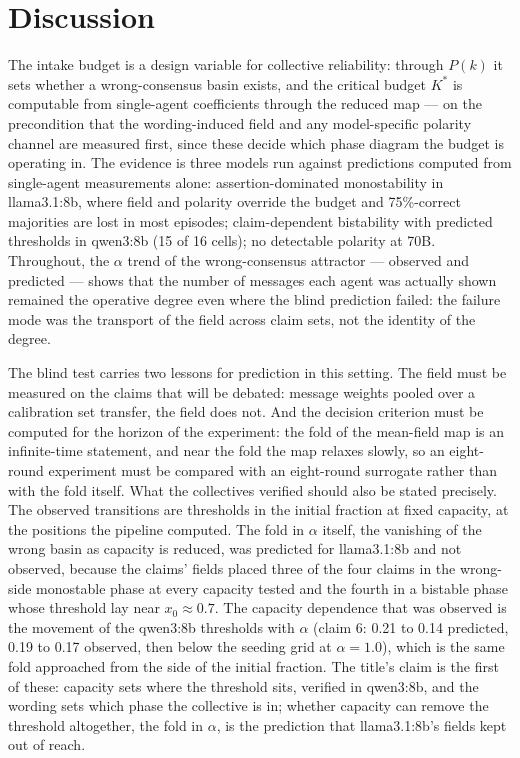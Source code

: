 \documentclass[9pt,twocolumn]{extarticle}
\begin{document}
\section{Discussion}\label{sec:discussion}

The intake budget is a design variable for collective reliability: through
$P(k)$ it sets whether a wrong-consensus basin exists, and the critical
budget $K^*$ is computable from single-agent coefficients through the reduced map ---
on the precondition that the wording-induced field and any model-specific
polarity channel are measured first, since these decide which phase diagram
the budget is operating in. The evidence is three models run against
predictions computed from single-agent measurements alone:
assertion-dominated monostability in llama3.1:8b, where field and polarity
override the budget and 75\%-correct majorities are lost in most episodes; claim-dependent
bistability with predicted thresholds in qwen3:8b (15 of 16 cells); no
detectable polarity at 70B. Throughout,
the $\alpha$ trend of the wrong-consensus attractor --- observed and
predicted --- shows that the number of messages each agent was actually shown
remained the operative degree even where the blind prediction failed: the
failure mode was the transport of the field across claim sets, not the
identity of the degree.

The blind test carries two lessons for prediction in this setting. The field
must be measured on the claims that will be debated: message weights pooled
over a calibration set transfer, the field does not. And the decision
criterion must be computed for the horizon of the experiment: the fold of the
mean-field map is an infinite-time statement, and near the fold the map
relaxes slowly, so an eight-round experiment must be compared with an
eight-round surrogate rather than with the fold itself. What the collectives
verified should also be stated precisely. The observed transitions are
thresholds in the initial fraction at fixed capacity, at the positions the
pipeline computed. The fold in $\alpha$ itself, the vanishing of the wrong
basin as capacity is reduced, was predicted for llama3.1:8b and not observed,
because the claims' fields placed three of the four claims in the
wrong-side monostable phase at every capacity tested and the fourth in a
bistable phase whose threshold lay near $x_0 \approx 0.7$. The capacity
dependence that was observed is
the movement of the qwen3:8b thresholds with $\alpha$ (claim 6: 0.21 to 0.14
predicted, 0.19 to 0.17 observed, then below the seeding grid at
$\alpha = 1.0$), which is the same fold approached from the side of the
initial fraction. The title's claim is the first of these: capacity sets
where the threshold sits, verified in qwen3:8b, and the wording sets which
phase the collective is in; whether capacity can remove the threshold
altogether, the fold in $\alpha$, is the prediction that llama3.1:8b's fields
kept out of reach.
\end{document}
